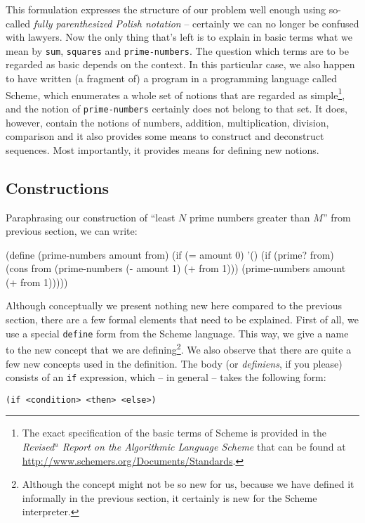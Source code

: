 This formulation expresses the structure of our problem
well enough using so-called \textit{fully parenthesized
Polish notation} -- certainly we can no longer be confused
with lawyers. Now the only thing that's left is to explain
in basic terms what we mean by \texttt{sum}, \texttt{squares}
and \texttt{prime-numbers}. The question which terms
are to be regarded as basic depends on the context.
In this particular case, we also happen to have written
(a fragment of) a program in a programming language called Scheme,
which enumerates a whole set of notions that are regarded as 
simple\footnote{The exact specification of the basic terms
of Scheme is provided in the \textit{Revised$^n$ Report on the
Algorithmic Language Scheme} that can be found at
\url{http://www.schemers.org/Documents/Standards}.}, and the notion of
\texttt{prime-numbers} certainly does not belong to that set.
It does, however, contain the notions of numbers, addition,
multiplication, division, comparison and it also provides some means
to construct and deconstruct sequences. Most importantly,
it provides means for defining new notions.

\subsection{Constructions}

Paraphrasing our construction of ``least $N$ prime numbers 
greater than $M$'' from previous section, we can write:

\begin{Snippet}
(define (prime-numbers amount from)
  (if (= amount 0)
    '()
    (if (prime? from)
      (cons from (prime-numbers (- amount 1) (+ from 1)))
      (prime-numbers amount (+ from 1)))))
\end{Snippet}

Although conceptually we present nothing new here compared to
the previous section, there are a few formal elements that need
to be explained. First of all, we use a special \texttt{define}
form from the Scheme language. This way, we give a name
to the new concept that we are defining\footnote{Although the
concept might not be so new for us, because we have defined
it informally in the previous section, it certainly is new for
the Scheme interpreter.}. We also observe that there are
quite a few new concepts used in the definition. The body (or
\textit{definiens}, if you please) consists of an \texttt{if}
expression, which -- in general -- takes the following form:

\texttt{(if <condition> <then> <else>)}

